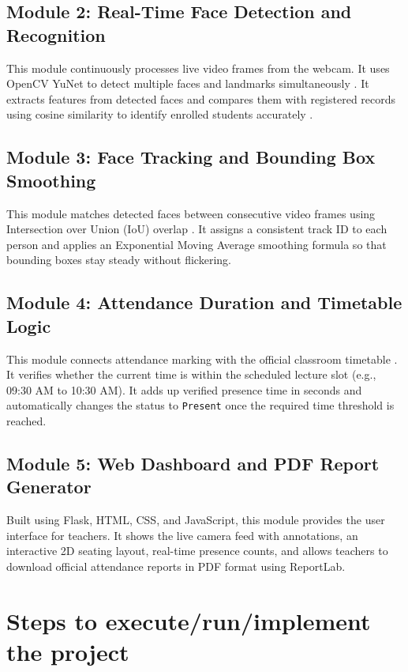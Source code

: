 \documentclass[10pt]{report}
\begin{document}
\subsection{Module 2: Real-Time Face Detection and Recognition}
\hspace{0.5cm}This module continuously processes live video frames from the webcam. It uses OpenCV YuNet to detect multiple faces and landmarks simultaneously \cite{zhang2023realtime}. It extracts features from detected faces and compares them with registered records using cosine similarity to identify enrolled students accurately \cite{angulakshmi2024face}.

\subsection{Module 3: Face Tracking and Bounding Box Smoothing}
\hspace{0.5cm}This module matches detected faces between consecutive video frames using Intersection over Union (IoU) overlap \cite{zhu2023tracking}. It assigns a consistent track ID to each person and applies an Exponential Moving Average smoothing formula so that bounding boxes stay steady without flickering.

\subsection{Module 4: Attendance Duration and Timetable Logic}
\hspace{0.5cm}This module connects attendance marking with the official classroom timetable \cite{rajesh2023smart}. It verifies whether the current time is within the scheduled lecture slot (e.g., 09:30 AM to 10:30 AM). It adds up verified presence time in seconds and automatically changes the status to \texttt{Present} once the required time threshold is reached.

\subsection{Module 5: Web Dashboard and PDF Report Generator}
\hspace{0.5cm}Built using Flask, HTML, CSS, and JavaScript, this module provides the user interface for teachers. It shows the live camera feed with annotations, an interactive 2D seating layout, real-time presence counts, and allows teachers to download official attendance reports in PDF format using ReportLab.

\section{Steps to execute/run/implement the project}
\end{document}
